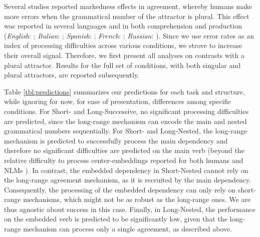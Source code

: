 Several studies reported markedness effects in agreement, whereby humans make more errors when the grammatical number of the attractor is plural. This effect was reported in several languages and in both comprehension and production (\textit{English}: \citet{Bock:Miller:1991, eberhard1997marked, wagers2009agreement}; \textit{Italian}: \citet{vigliocco1995constructing}; \textit{Spanish}: \citet{bock2012number, lago2015agreement}; \textit{French}: \citet{franck2002subject}; \textit{Russian}: \citet{lorimor2008agreement}). Since we use error rates as an index of processing difficulties across various conditions, we strove to increase their overall signal. Therefore, we first present all analyses on contrasts with a plural attractor.
Results for the full set of conditions, with both singular and plural attractors, are reported subsequently.

Table \ref{tbl:predictions} summarizes our predictions for each task and structure, while ignoring for now, for ease of presentation, differences among specific conditions. 
For Short- and Long-Successive, no significant processing difficulties are predicted, since the long-range mechanism can encode the main and nested grammatical numbers sequentially. 
For Short- and Long-Nested, the long-range mechanism is predicted to successfully process the main dependency and therefore no significant difficulties are predicted on the main verb (beyond the relative difficulty to process center-embeddings reported for both humans \citep{traxler2002processing} and NLMs \citep{marvin2018targeted}). In contrast, the embedded dependency in Short-Nested cannot rely on the long-range agreement mechanism, as it is recruited by the main dependency. Consequently, the processing of the embedded dependency can only rely on short-range mechanisms, which might not be as robust as the long-range ones. We are thus agnostic about success in this case. Finally, in Long-Nested, the performance on the embedded verb is predicted to be significantly low, given that the long-range mechanism can process only a single agreement, as described above.

